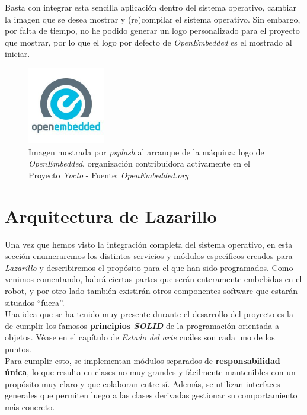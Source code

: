 Basta con integrar esta sencilla aplicación dentro del sistema operativo, cambiar la imagen que se desea mostrar y (re)compilar el sistema operativo. Sin embargo, por falta de tiempo, no he podido generar un logo personalizado para el proyecto que mostrar, por lo que el logo por defecto de \textit{OpenEmbedded} es el mostrado al iniciar.\\

\begin{figure}[h]
	\centering
	\includegraphics[width=0.3\textwidth]{imagenes/openembedded.jpg}
	\caption{Imagen mostrada por \textit{psplash} al arranque de la máquina: logo de \textit{OpenEmbedded}, organización contribuidora activamente en el Proyecto \textit{Yocto} - Fuente: \textit{OpenEmbedded.org} \cite{openembedded}}
	\label{openembedded}
\end{figure}


\section{Arquitectura de Lazarillo}

Una vez que hemos visto la integración completa del sistema operativo, en esta sección enumeraremos los distintos servicios y módulos específicos creados para \textit{Lazarillo} y describiremos el propósito para el que han sido programados. Como venimos comentando, habrá ciertas partes que serán enteramente embebidas en el robot, y por otro lado también existirán otros componentes software que estarán situados ``fuera''.\\

Una idea que se ha tenido muy presente durante el desarrollo del proyecto es la de cumplir los famosos \textbf{principios \textit{SOLID}} de la programación orientada a objetos. Véase en el capítulo de \textit{Estado del arte} cuáles son cada uno de los puntos.\\

Para cumplir esto, se implementan módulos separados de \textbf{responsabilidad única}, lo que resulta en clases no muy grandes y fácilmente mantenibles con un propósito muy claro y que colaboran entre sí. Además, se utilizan interfaces generales que permiten luego a las clases derivadas gestionar su comportamiento más concreto.\\

